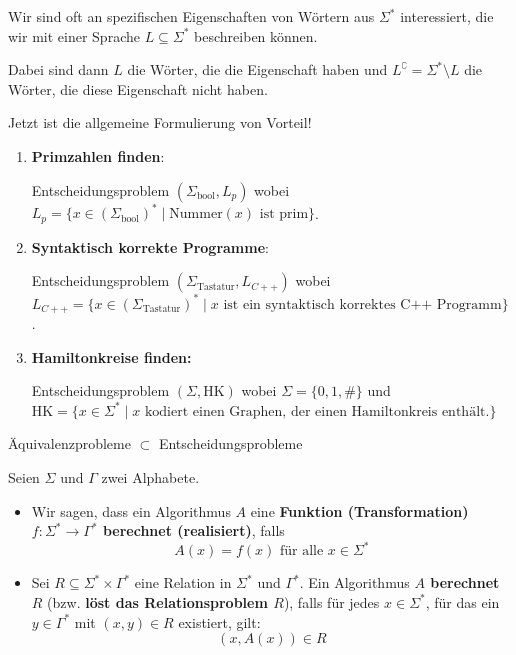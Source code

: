 \documentclass[a4paper, 11pt]{article}
\begin{document}
	Wir sind oft an spezifischen Eigenschaften von Wörtern aus $\Sigma^*$ interessiert, die wir mit einer Sprache $L \subseteq \Sigma^*$ beschreiben können.

	Dabei sind dann $L$ die Wörter, die die Eigenschaft haben und $L^\complement = \Sigma^* \setminus L$ die Wörter, die diese Eigenschaft nicht haben. 

	Jetzt ist die allgemeine Formulierung von Vorteil!



	\begin{enumerate}[label=\roman*.]
		\item \textbf{Primzahlen finden}: 
		
		Entscheidungsproblem $(\Sigma_{\text{bool}}, L_p)$ wobei \\
        $L_p = \{x \in (\Sigma_{\text{bool}})^* \mid \text{Nummer}(x) \text{ ist prim}\}$.
		\item \textbf{Syntaktisch korrekte Programme}: 
		
		Entscheidungsproblem $(\Sigma_{\text{Tastatur}}, L_{C++})$ wobei\\ 
        $L_{C++} = \{x \in (\Sigma_{\text{Tastatur}})^* \mid x \text{ ist ein syntaktisch korrektes C++ Programm}\}$.
		\item \textbf{Hamiltonkreise finden: } 
		
		Entscheidungsproblem $(\Sigma, \text{HK})$ wobei $\Sigma = \{0,1,\#\}$ und \\
        HK$=\{x \in \Sigma^* \mid x \text{ kodiert einen Graphen, der einen Hamiltonkreis enthält.}\}$
	\end{enumerate}
	Äquivalenzprobleme $\subset$ Entscheidungsprobleme



	\begin{mainbox}{}
		Seien $\Sigma$ und $\Gamma$ zwei Alphabete. 
		\begin{itemize}[label=-]
			\item Wir sagen, dass ein Algorithmus $A$ eine \textbf{Funktion (Transformation) $f: \Sigma^* \to \Gamma^*$ berechnet (realisiert)}, falls
			$$A(x) = f(x) \text{ für alle } x \in \Sigma^*$$
			\item Sei $R \subseteq \Sigma^* \times \Gamma^*$ eine Relation in $\Sigma^*$ und $\Gamma^*$. Ein Algorithmus \textbf{$A$ berechnet $R$} 
			(bzw. \textbf{löst das Relationsproblem $R$}), falls für jedes $x \in \Sigma^*$, für das ein $y \in \Gamma^*$ mit $(x,y) \in R$ existiert, gilt:
			$$(x, A(x)) \in R$$
		\end{itemize}
		
	\end{mainbox}
\end{document}
